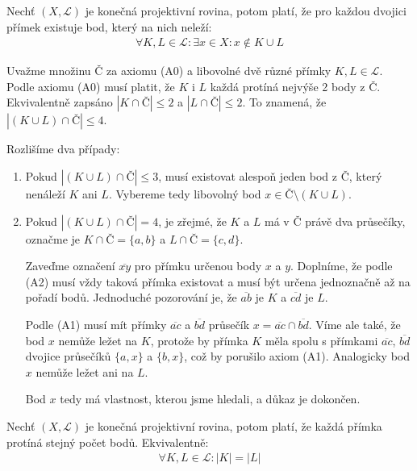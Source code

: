 \begin{t_lemma}
  Nechť $(X, \mathcal{L})$ je konečná projektivní rovina, potom platí, že pro každou dvojici přímek existuje bod, který na nich neleží:
  \begin{align*}
    \forall K, L\in\mathcal{L} : \exists x\in X : x\notin K\cup L
  \end{align*}
\end{t_lemma}
\begin{t_proof}
  Uvažme množinu $Č$ za axiomu (A0) a libovolné dvě různé přímky $K, L\in\mathcal{L}$. Podle axiomu (A0) musí platit, že $K$ i $L$ každá protíná nejvýše 2 body z $Č$. Ekvivalentně zapsáno $|K\cap Č|\leq 2$ a $|L\cap Č|\leq 2$. To znamená, že $|(K\cup L)\cap Č|\leq 4$.
  
  Rozlišíme dva případy:
  \begin{enumerate}
    \item Pokud $|(K\cup L)\cap Č|\leq 3$, musí existovat alespoň jeden bod z $Č$, který nenáleží $K$ ani $L$. Vybereme tedy libovolný bod $x\in Č\setminus(K\cup L)$.
    \item Pokud $|(K\cup L)\cap Č|= 4$, je zřejmé, že $K$ a $L$ má v $Č$ právě dva průsečíky, označme je $K\cap Č=\{a,b\}$ a $L\cap Č=\{c,d\}$.
    
    Zaveďme označení $\overline{xy}$ pro přímku určenou body $x$ a $y$. Doplníme, že podle (A2) musí vždy taková přímka existovat a musí být určena jednoznačně až na pořadí bodů. Jednoduché pozorování je, že $\overline{ab}$ je $K$ a $\overline{cd}$ je $L$.
    
    Podle (A1) musí mít přímky $\overline{ac}$ a $\overline{bd}$ průsečík $x=\overline{ac}\cap\overline{bd}$. Víme ale také, že bod $x$ nemůže ležet na $K$, protože by přímka $K$ měla spolu s přímkami $\overline{ac}$, $\overline{bd}$ dvojice průsečíků $\{a,x\}$ a $\{b,x\}$, což by porušilo axiom (A1). Analogicky bod $x$ nemůže ležet ani na $L$.
    
    Bod $x$ tedy má vlastnost, kterou jsme hledali, a důkaz je dokončen.
  \end{enumerate}
\end{t_proof}

\begin{t_theorem}
  Nechť $(X, \mathcal{L})$ je konečná projektivní rovina, potom platí, že každá přímka protíná stejný počet bodů. Ekvivalentně:
  \begin{align*}
    \forall K, L\in\mathcal{L}:|K|=|L|
  \end{align*}
\end{t_theorem}

